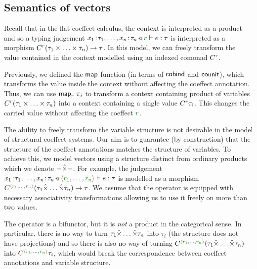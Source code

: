 
\subsection{Semantics of vectors}

Recall that in the flat coeffect calculus, the context is interpreted as a product and so a typing
judgement $\coctx{x_1\!:\!\tau_1, \ldots, x_n\!:\!\tau_n}{\cclrd{r}} \vdash e : \tau$ is interpreted as a
morphism $\ctyp{\cclrd{r}}{(\tau_1 \times \ldots \times \tau_n)} \rightarrow \tau$. In this model,
we can freely transform the value contained in the context modelled using an indexed comonad
$\ctyp{\cclrd{r}}$.

Previously, we defined the $\textnormal{\sffamily map}$ function (in terms of $\textnormal{\sffamily cobind}$ and $\textnormal{\sffamily counit}$),
which transforms the value inside the context without affecting the coeffect annotation. Thus,
we can use $\ident{map}_{\cclrd{r}}~\pi_i$ to transform a context containing product of variables
$\ctyp{\cclrd{r}}{(\tau_1 \times \ldots \times \tau_n)}$ into a context containing a single value
$\ctyp{\cclrd{r}}{\tau_i}$. This changes the carried value without affecting the coeffect $\cclrd{r}$.

The ability to freely transform the variable structure is not desirable in the model of
structural coeffect systems. Our aim is to guarantee (by construction) that the structure of
the coeffect annotations matches the structure of variables. To achieve this, we model vectors
using a structure distinct from ordinary products which we denote $-\hat{\times}-$.
For example, the judgement $\coctx{x_1\!:\!\tau_1, \ldots, x_n\!:\!\tau_n}{\alift{\cclrd{r_1},\ldots,\cclrd{r_n}}} \vdash e : \tau$
is modelled as a morphism $\ctyp{\alift{\cclrd{r_1},\ldots,\cclrd{r_n}}}{(\tau_1 \xtimes \ldots \xtimes \tau_n)} \rightarrow \tau$.
We assume that the operator is equipped with necessary associativity transformations allowing us
to use it freely on more than two values.

The operator is a bifunctor, but it is \emph{not} a product in the categorical sense. In particular,
there is no way to turn $\tau_1 \hat{\times} \ldots \hat{\times} \tau_n$ into $\tau_i$ (the structure does
not have projections) and so there is also no way of turning
$\ctyp{\alift{\cclrd{r_1},\ldots,\cclrd{r_n}}}{(\tau_1 \xtimes \ldots \xtimes \tau_n)}$ into
$\ctyp{\alift{\cclrd{r_1},\ldots,\cclrd{r_n}}}{\tau_i}$, which would break the correspondence
between coeffect annotations and variable structure.

